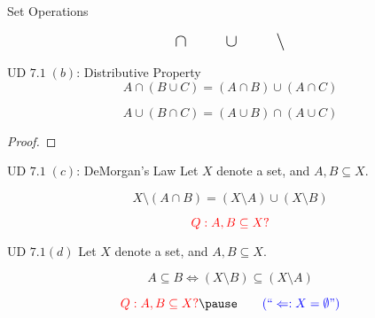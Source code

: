 \begin{frame}{}
  \centerline{\Large Set Operations}

  \[
    \text{\Large $\cap \qquad \cup \qquad \setminus$}
  \]
\end{frame}

\begin{frame}{}
  \begin{exampleblock}{UD $7.1 \;(b)$: Distributive Property}
    \[
      A \cap (B \cup C) = (A \cap B) \cup (A \cap C)
    \]
  \end{exampleblock}

  \pause
  \vspace{0.50cm}
  \begin{theorem}
    \[
      A \cup (B \cap C) = (A \cup B) \cap (A \cup C)
    \]
  \end{theorem}

  \begin{proof}
  \end{proof}
\end{frame}

\begin{frame}{}
  \begin{exampleblock}{UD $7.1 \;(c)$: DeMorgan's Law}
    Let $X$ denote a set, and $A, B \subseteq X$.

    \[
      X \setminus (A \cap B) = (X \setminus A) \cup (X \setminus B)
    \]
  \end{exampleblock}

  \pause
  \vspace{0.50cm}
  \[
    \textcolor{red}{Q: A, B \subseteq X?}
  \]
\end{frame}

\begin{frame}{}
  \begin{exampleblock}{UD $7.1 (d)$}
    Let $X$ denote a set, and $A, B \subseteq X$.

    \[
      A \subseteq B \iff (X \setminus B) \subseteq (X \setminus A)
    \]
  \end{exampleblock}

  \pause
  \vspace{0.50cm}

  \pause
  \[
    \red{Q: A, B \subseteq X?} \pause \qquad \blue{(``\Leftarrow: X = \emptyset")}
  \]
\end{frame}

